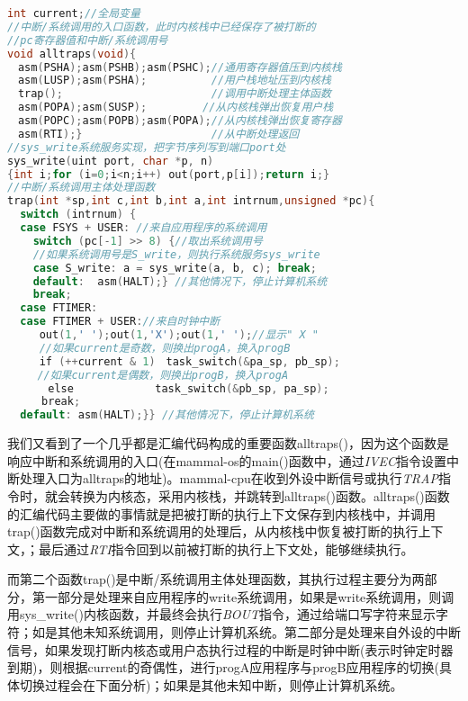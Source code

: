 \begin{lstlisting}[language={C}]
int current;//全局变量
//中断/系统调用的入口函数，此时内核栈中已经保存了被打断的
//pc寄存器值和中断/系统调用号
void alltraps(void){
　asm(PSHA);asm(PSHB);asm(PSHC);//通用寄存器值压到内核栈
　asm(LUSP);asm(PSHA);          //用户栈地址压到内核栈
　trap();                       //调用中断处理主体函数
　asm(POPA);asm(SUSP); 　　　　 //从内核栈弹出恢复用户栈
　asm(POPC);asm(POPB);asm(POPA);//从内核栈弹出恢复寄存器
　asm(RTI);}                    //从中断处理返回
//sys_write系统服务实现，把字节序列写到端口port处
sys_write(uint port, char *p, n) 
{int i;for (i=0;i<n;i++) out(port,p[i]);return i;}
//中断/系统调用主体处理函数
trap(int *sp,int c,int b,int a,int intrnum,unsigned *pc){
  switch (intrnum) {
  case FSYS + USER: //来自应用程序的系统调用
    switch (pc[-1] >> 8) {//取出系统调用号
    //如果系统调用号是S_write，则执行系统服务sys_write
    case S_write: a = sys_write(a, b, c); break;
    default:  asm(HALT);} //其他情况下，停止计算机系统
    break;   
  case FTIMER:  
  case FTIMER + USER://来自时钟中断
　　　out(1,' ');out(1,'X');out(1,' ');//显示" X "
　　　//如果current是奇数，则换出progA，换入progB
　　　if (++current & 1)　task_switch(&pa_sp, pb_sp);
   　//如果current是偶数，则换出progB，换入progA
   　　else　 　　　　　　task_switch(&pb_sp, pa_sp);
  　　break;
  default: asm(HALT);}} //其他情况下，停止计算机系统
\end{lstlisting}

我们又看到了一个几乎都是汇编代码构成的重要函数alltraps()，因为这个函数是响应中断和系统调用的入口(在mammal-os的main()函数中，通过\textit{IVEC}指令设置中断处理入口为alltraps的地址)。mammal-cpu在收到外设中断信号或执行\textit{TRAP}指令时，就会转换为内核态，采用内核栈，并跳转到alltraps()函数。alltraps()函数的汇编代码主要做的事情就是把被打断的执行上下文保存到内核栈中，并调用trap()函数完成对中断和系统调用的处理后，从内核栈中恢复被打断的执行上下文，；最后通过\textit{RTI}指令回到以前被打断的执行上下文处，能够继续执行。

而第二个函数trap()是中断/系统调用主体处理函数，其执行过程主要分为两部分，第一部分是处理来自应用程序的write系统调用，如果是write系统调用，则调用sys\_write()内核函数，并最终会执行\textit{BOUT}指令，通过给端口写字符来显示字符；如是其他未知系统调用，则停止计算机系统。第二部分是处理来自外设的中断信号，如果发现打断内核态或用户态执行过程的中断是时钟中断(表示时钟定时器到期)，则根据current的奇偶性，进行progA应用程序与progB应用程序的切换(具体切换过程会在下面分析)；如果是其他未知中断，则停止计算机系统。

